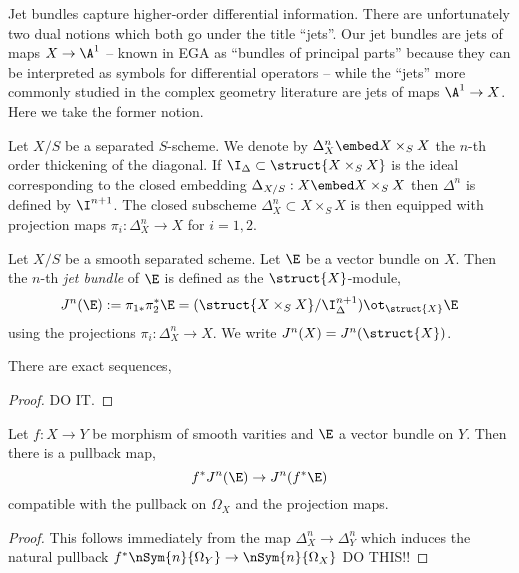 \documentclass[12pt]{article}
\begin{document}
Jet bundles capture higher-order differential information. There are unfortunately two dual notions which both go under the title ``jets''. Our jet bundles are jets of maps $X \to \A^1$ -- known in EGA as ``bundles of principal parts'' because they can be interpreted as symbols for differential operators  -- while the ``jets'' more commonly studied in the complex geometry literature are jets of maps $\A^1 \to X$. Here we take the former notion. 

\begin{defn}
Let $X /S$ be a separated $S$-scheme. We denote by $\Delta^n_X \embed X \times_S X$ the $n$-th order thickening of the diagonal. If $\I_\Delta \subset \struct{X \times_S X}$ is the ideal corresponding to the closed embedding $\Delta_{X/S} : X \embed X \times_S X$ then $\Delta^n$ is defined by $\I^{n+1}$. The closed subscheme $\Delta^n_X \subset X \times_S X$ is then equipped with projection maps $\pi_i : \Delta^n_X \to X$ for $i = 1,2$.
\end{defn}

\begin{defn}
Let $X / S$ be a smooth separated scheme. Let $\E$ be a vector bundle on $X$. Then the $n$-th \textit{jet bundle} of $\E$ is defined as the $\struct{X}$-module,
\[ J^n(\E) := \pi_{1*} \pi_2^* \E = (\struct{X \times_S X} / \I_\Delta^{n+1}) \ot_{\struct{X}} \E \]
using the projections $\pi_i : \Delta^n_X \to X$. We write $J^n(X) = J^n(\struct{X})$.
\end{defn}

\begin{prop}
There are exact sequences,
\begin{center}
\end{center}
\end{prop}

\begin{proof}
DO IT.
\end{proof}

\begin{prop}
Let $f : X \to Y$ be morphism of smooth varities and $\E$ a vector bundle on $Y$. Then there is a pullback map,
\[ f^* J^n(\E) \to J^n(f^* \E) \]
compatible with the pullback on $\Omega_X$ and the projection maps.
\end{prop}

\begin{proof}
This follows immediately from the map $\Delta_X^n \to \Delta_Y^n$ which induces the natural pullback $f^* \nSym{n}{\Omega_Y} \to \nSym{n}{\Omega_X}$ DO THIS!!
\end{proof}
\end{document}
